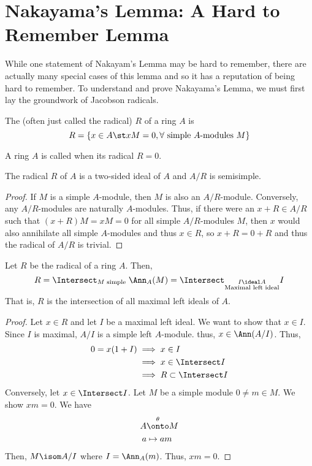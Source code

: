 \documentclass[11pt,leqno,oneside]{amsbook}
\numberwithin{thm}{section}
\begin{document}
\section{Nakayama's Lemma: A Hard to Remember Lemma}
While one statement of Nakayam's Lemma may be hard to remember, there
are actually many special cases of this lemma and so it has a
reputation of being hard to remember. To understand and prove
Nakayama's Lemma, we must first lay the groundwork of Jacobson
radicals.
\begin{defn}
  The  (often just called the radical) \(R\) of a
  ring \(A\) is \[
    R = \{x \in A \st xM = 0, \forall \text{ simple }A\text{-modules }M\}
  \]
\end{defn}
\begin{defn}
  A ring \(A\) is called  when its radical \(R = 0\). 
\end{defn}
\begin{thm}\label{radical-is-2-sided-ideal}
  The radical \(R\) of \(A\) is a two-sided ideal of \(A\) and \(A/R\)
  is semisimple.
\end{thm}
\begin{proof}
  If \(M\) is a simple \(A\)-module, then \(M\) is also an
  \(A/R\)-module. Conversely, any \(A/R\)-modules are naturally
  \(A\)-modules. Thus, if there were an \(x + R \in A/R\) such that
  \((x+R)M = xM = 
  0\) for all simple \(A/R\)-modules \(M\), then \(x\) would also
  annihilate all simple \(A\)-modules and thus \(x \in R\), so \(x+R =
  0 + R\) and thus the radical of \(A/R\) is trivial.
\end{proof}
\begin{thm}\label{radical-is-intersection-of-maxl-ideals}
  Let \(R\) be the radical of a ring \(A\). Then, \[
    R = \Intersect_{M \text{ simple }} \Ann_A (M) = \Intersect_{\substack{I
      \ideal A \\ \text{Maximal left ideal}}} I
  \]
  That is, \(R\) is the intersection of all maximal left ideals of \(A\).
\end{thm}
\begin{proof}
  Let \(x \in R\) and let \(I\) be a maximal left ideal. We want to
  show that \(x \in I\). Since \(I\) is maximal, \(A/I\) is a simple
  left \(A\)-module. thus, \(x \in \Ann(A/I)\). Thus,
  \begin{align*}
    0 = x(1+I) & \implies x \in I \\
               & \implies x \in \Intersect I \\
               & \implies R \subset \Intersect I
  \end{align*}
  Conversely, let \(x \in \Intersect I\). Let \(M\) be a simple module
  \(0 \neq m \in M\). We show \(xm = 0\). We have
  \begin{align*}
    A & \overset{\theta}{\onto} M \\
    a & \mapsto am
  \end{align*}
  Then, \(M \isom A/I\) where \(I = \Ann_A(m)\). Thus, \(xm = 0\).
\end{proof}
\end{document}
